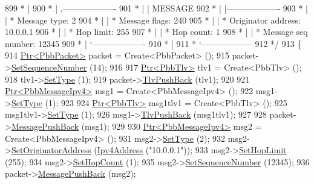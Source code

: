 \begin{DoxyCode}
899 \textcolor{comment}{         * |}
900 \textcolor{comment}{         * |    ,-------------------}
901 \textcolor{comment}{         * |    |  MESSAGE}
902 \textcolor{comment}{         * |    |-------------------}
903 \textcolor{comment}{         * |    | * Message type:       2}
904 \textcolor{comment}{         * |    | * Message flags:  240}
905 \textcolor{comment}{         * |    | * Originator address: 10.0.0.1}
906 \textcolor{comment}{         * |    | * Hop limit:          255}
907 \textcolor{comment}{         * |    | * Hop count:          1}
908 \textcolor{comment}{         * |    | * Message seq number: 12345}
909 \textcolor{comment}{         * |    `-------------------}
910 \textcolor{comment}{         * |}
911 \textcolor{comment}{         * `------------------}
912 \textcolor{comment}{   */}
913   \{
914     \hyperlink{classns3_1_1Ptr}{Ptr<PbbPacket>} packet = Create<PbbPacket> ();
915     packet->\hyperlink{classns3_1_1PbbPacket_a7d6a1602be86109760d0f26ff9bbbb8e}{SetSequenceNumber} (14);
916 
917     \hyperlink{classns3_1_1Ptr}{Ptr<PbbTlv>} tlv1 = Create<PbbTlv> ();
918     tlv1->\hyperlink{classns3_1_1PbbTlv_a90a0452018ed364ac37c3ad116dd718b}{SetType} (1);
919     packet->\hyperlink{classns3_1_1PbbPacket_a34935793e729a106c176db99c969cb42}{TlvPushBack} (tlv1);
920 
921     \hyperlink{classns3_1_1Ptr}{Ptr<PbbMessageIpv4>} msg1 = Create<PbbMessageIpv4> ();
922     msg1->\hyperlink{classns3_1_1PbbMessage_a4b3d1eaabd3e7412a46ac79bf3360dac}{SetType} (1);
923 
924     \hyperlink{classns3_1_1Ptr}{Ptr<PbbTlv>} msg1tlv1 = Create<PbbTlv> ();
925     msg1tlv1->\hyperlink{classns3_1_1PbbTlv_a90a0452018ed364ac37c3ad116dd718b}{SetType} (1);
926     msg1->\hyperlink{classns3_1_1PbbMessage_aac70b2672f79765cf5cc5b6666018165}{TlvPushBack} (msg1tlv1);
927 
928     packet->\hyperlink{classns3_1_1PbbPacket_a4a3170001ef758d9c9c4375b8f089826}{MessagePushBack} (msg1);
929 
930     \hyperlink{classns3_1_1Ptr}{Ptr<PbbMessageIpv4>} msg2 = Create<PbbMessageIpv4> ();
931     msg2->\hyperlink{classns3_1_1PbbMessage_a4b3d1eaabd3e7412a46ac79bf3360dac}{SetType} (2);
932     msg2->\hyperlink{classns3_1_1PbbMessage_a52ac135a2bec53db5e8f46b8b8a25e7c}{SetOriginatorAddress} (\hyperlink{classns3_1_1Ipv4Address}{Ipv4Address} (\textcolor{stringliteral}{"10.0.0.1"}));
933     msg2->\hyperlink{classns3_1_1PbbMessage_a532a7e5e135f7491f8a84ab1dfadd28f}{SetHopLimit} (255);
934     msg2->\hyperlink{classns3_1_1PbbMessage_a882ec7e2e9a9dff6297152c196d54ce4}{SetHopCount} (1);
935     msg2->\hyperlink{classns3_1_1PbbMessage_a8c24696ac67507afa03c9750daccc47d}{SetSequenceNumber} (12345);
936     packet->\hyperlink{classns3_1_1PbbPacket_a4a3170001ef758d9c9c4375b8f089826}{MessagePushBack} (msg2);

\end{DoxyCode}
